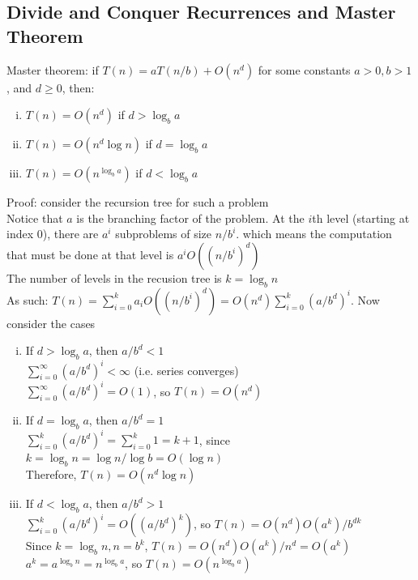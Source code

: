 \documentclass{article}
\begin{document}
		\subsection{Divide and Conquer Recurrences and Master Theorem}
			Master theorem: if $T(n) = aT(n/b) + O(n^d)$ for some constants $a > 0, b > 1$, and $d \geq 0$, then:
			\begin{enumerate}[(i)]
				\item $T(n) = O(n^d)$ if $d > \log_b a$
				\item $T(n) = O(n^d \log n)$ if $d = \log_b a$
				\item $T(n) = O(n^{\log_b a})$ if $d < \log_b a$
				\end{enumerate}
			Proof: consider the recursion tree for such a problem \\
			Notice that $a$ is the branching factor of the problem. At the $i$th level (starting at index 0), there are $a^i$ subproblems of size $n/b^i$. which means the computation that must be done at that level is $a^iO((n/b^i)^d)$ \\
			The number of levels in the recusion tree is $k = \log_b n$ \\
			As such: $T(n) = \sum_{i = 0}^k a_iO((n/b^i)^d) = O(n^d)\sum_{i = 0}^k(a/b^d)^i$. Now consider the cases
			\begin{enumerate}[(i)]
				\item If $d > \log_b a$, then $a/b^d < 1$ \\
				$\sum_{i = 0}^\infty (a/b^d)^i < \infty$ (i.e. series converges) \\
				$\sum_{i = 0}^\infty (a/b^d)^i = O(1)$, so $T(n) = O(n^d)$
				\item If $d = \log_b a$, then $a/b^d = 1$ \\
				$\sum_{i = 0}^k (a/b^d)^i = \sum_{i = 0}^k 1 = k + 1$, since $k = \log_b n = \log n/\log b = O(\log n)$ \\
				Therefore, $T(n) = O(n^d\log n)$
				\item If $d < \log_b a$, then $a/b^d > 1$ \\
				$\sum_{i = 0}^k (a/b^d)^i = O((a/b^d)^k)$, so $T(n) = O(n^d)O(a^k)/b^{dk}$ \\
				Since $k = \log_b n, n = b^k$, $T(n) = O(n^d)O(a^k)/n^d = O(a^k)$ \\
				$a^k = a^{\log_b n} = n^{\log_b a}$, so $T(n) = O(n^{\log_b a})$
				\end{enumerate}
\end{document}
